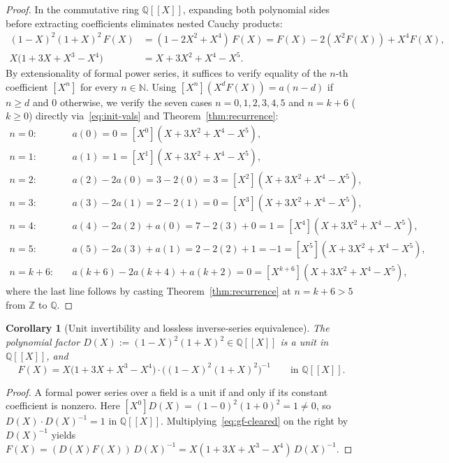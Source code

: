 \documentclass[11pt]{article}
\newcommand{\llbracket}{[\![}
\newcommand{\rrbracket}{]\!]}
\newtheorem{corollary}[theorem]{Corollary}
\theoremstyle{definition}
\newcommand{\N}{\mathbb{N}}
\newcommand{\Z}{\mathbb{Z}}
\newcommand{\Q}{\mathbb{Q}}
\begin{document}
\begin{proof}
In the commutative ring $\Q\llbracket X \rrbracket$, expanding both polynomial sides before extracting coefficients eliminates nested Cauchy products:
\begin{align*}
(1 - X)^2 (1 + X)^2 \, F(X) &= (1 - 2X^2 + X^4)\,F(X) = F(X) - 2(X^2 F(X)) + X^4 F(X), \\
X\bigl(1 + 3X + X^3 - X^4\bigr) &= X + 3X^2 + X^4 - X^5.
\end{align*}
By extensionality of formal power series, it suffices to verify equality of the $n$-th coefficient $[X^n]$ for every $n \in \N$. Using $[X^n](X^d F(X)) = a(n - d)$ if $n \ge d$ and $0$ otherwise, we verify the seven cases $n = 0, 1, 2, 3, 4, 5$ and $n = k + 6$ ($k \ge 0$) directly via~\eqref{eq:init-vals} and Theorem~\ref{thm:recurrence}:
\begin{align*}
n = 0:\quad & a(0) = 0 = [X^0](X + 3X^2 + X^4 - X^5), \\
n = 1:\quad & a(1) = 1 = [X^1](X + 3X^2 + X^4 - X^5), \\
n = 2:\quad & a(2) - 2a(0) = 3 - 2(0) = 3 = [X^2](X + 3X^2 + X^4 - X^5), \\
n = 3:\quad & a(3) - 2a(1) = 2 - 2(1) = 0 = [X^3](X + 3X^2 + X^4 - X^5), \\
n = 4:\quad & a(4) - 2a(2) + a(0) = 7 - 2(3) + 0 = 1 = [X^4](X + 3X^2 + X^4 - X^5), \\
n = 5:\quad & a(5) - 2a(3) + a(1) = 2 - 2(2) + 1 = -1 = [X^5](X + 3X^2 + X^4 - X^5), \\
n = k + 6:\quad & a(k + 6) - 2a(k + 4) + a(k + 2) = 0 = [X^{k+6}](X + 3X^2 + X^4 - X^5),
\end{align*}
where the last line follows by casting Theorem~\ref{thm:recurrence} at $n = k + 6 > 5$ from $\Z$ to $\Q$.
\end{proof}

\begin{corollary}[Unit invertibility and lossless inverse-series equivalence]
\label{cor:unit-inv}
The polynomial factor $D(X) := (1 - X)^2(1 + X)^2 \in \Q\llbracket X \rrbracket$ is a unit in $\Q\llbracket X \rrbracket$, and
\[
F(X) = X\bigl(1 + 3X + X^3 - X^4\bigr) \cdot \bigl((1 - X)^2(1 + X)^2\bigr)^{-1} \qquad \text{in }\Q\llbracket X \rrbracket.
\]
\end{corollary}

\begin{proof}
A formal power series over a field is a unit if and only if its constant coefficient is nonzero. Here $[X^0]D(X) = (1 - 0)^2(1 + 0)^2 = 1 \ne 0$, so $D(X) \cdot D(X)^{-1} = 1$ in $\Q\llbracket X \rrbracket$. Multiplying~\eqref{eq:gf-cleared} on the right by $D(X)^{-1}$ yields $F(X) = (D(X) F(X))\,D(X)^{-1} = X(1 + 3X + X^3 - X^4)\,D(X)^{-1}$.
\end{proof}
\end{document}
